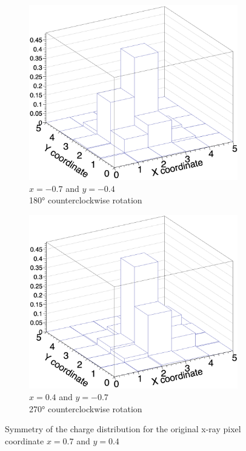\documentclass{article}
\begin{document}
\begin{figure}[H]
\begin{subfigure}{.5\textwidth}
  \centering
  \includegraphics[width=.9\linewidth]{images/q3.png}
  \caption{$x=-0.7$ and $y=-0.4$\\180° counterclockwise rotation}
  \label{fig:q3}
\end{subfigure}%
\begin{subfigure}{.5\textwidth}
  \centering
  \includegraphics[width=.9\linewidth]{images/q4.png}
  \caption{$x=0.4$ and $y=-0.7$\\270° counterclockwise rotation}
  \label{fig:q4}
\end{subfigure}
\caption{Symmetry of the charge distribution for the original x-ray pixel coordinate $x=0.7$ and $y=0.4$}
\label{fig:q}
\end{figure}
\end{document}
